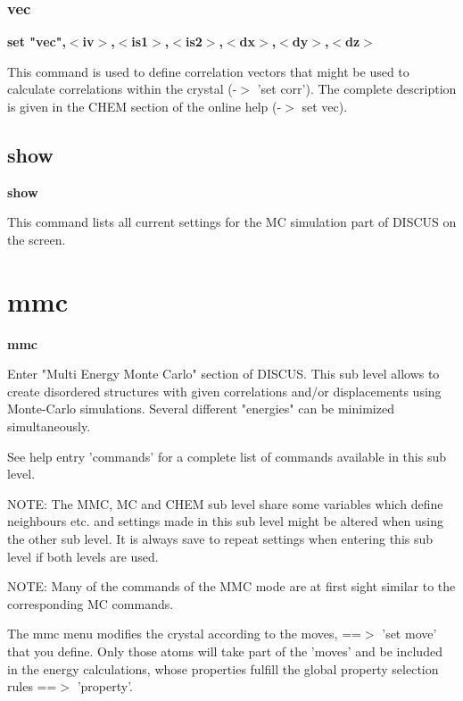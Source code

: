 \subsubsection{vec}
{\bf set "vec",$ <$iv$> $,$ <$is1$> $,$ <$is2$> $,$ <$dx$> $,$ <$dy$> $,$ <$dz$> $ \par }
\par
\vspace{3pt}
This command is used to define correlation vectors that might be used 
to calculate correlations within the crystal (-$> $ 'set corr'). The 
complete description is given in the CHEM section of the online 
help (-$> $ set vec). 
\subsection*{show}
{\bf show \par }
\par
\vspace{3pt}
This command lists all current settings for the MC simulation part 
of DISCUS on the screen. 
\section{mmc}
{\bf mmc \par }
\par
\vspace{3pt}
Enter "Multi Energy Monte Carlo" section of DISCUS. This sub level 
allows to create disordered structures with given correlations and/or 
displacements using Monte-Carlo simulations. Several different 
"energies" can be minimized simultaneously. 
\par
See help entry 'commands' for a complete list 
of commands available in this sub level. 
\par
NOTE: The MMC, MC and CHEM sub level share some variables which define 
      neighbours etc. and settings made in this sub level might be 
      altered when using the other sub level. It is always save to 
      repeat settings when entering this sub level if both levels 
      are used. 
\par
NOTE: Many of the commands of the MMC mode are at first sight 
      similar to the corresponding MC commands. 
\par
The mmc menu modifies the crystal according to the moves, ==$> $ 'set move' 
that you define. Only those atoms will take part of the 'moves' and 
be included in the energy calculations, whose properties fulfill the 
global property selection rules ==$> $ 'property'. 
\par
